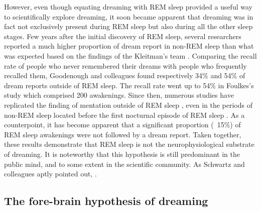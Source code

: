 However, even though equating dreaming with REM sleep provided a useful way to scientifically explore dreaming, it soon became apparent that dreaming was in fact not exclusively present during REM sleep but also during all the other sleep stages. Few years after the initial discovery of REM sleep, several researchers reported a much higher proportion of dream report in non-REM sleep than what was expected based on the findings of the Kleitman’s team \citep{goodenough_comparison_1959, foulkes_dream_1962}. Comparing the recall rate of people who never remembered their dreams with people who frequently recalled them, Goodenough and colleagues found respectively 34\% and 54\% of dream reports outside of REM sleep. The recall rate went up to 54\% in Foulkes’s study which comprised 200 awakenings. Since then, numerous studies have replicated the finding of mentation outside of REM sleep \citep{nielsen_review_2000}, even in the periods of non-REM sleep located before the first nocturnal episode of REM sleep \citep{noreika_early-night_2009}. As a counterpoint, it has become apparent that a significant proportion (~15\%) of REM sleep awakenings were not followed by a dream report. Taken together, these results demonstrate that REM sleep is not the neurophysiological substrate of dreaming. It is noteworthy that this hypothesis is still predominant in the public mind, and to some extent in the scientific community. As Schwartz and colleagues aptly pointed out,  \citep{schwartz_dreaming:_2005}.

\subsection{The fore-brain hypothesis of dreaming}
\label{sec:dream-research:link:solms}

